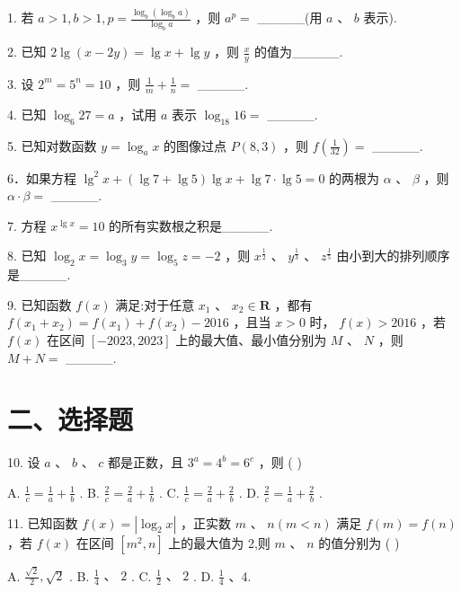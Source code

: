 1. 若 $a > 1,b > 1,p = \frac{{\log }_{b}\left( {{\log }_{b}a}\right) }{{\log }_{b}a}$ ，则 ${a}^{p} =$ \_\_\_\_\_(用 $a$ 、 $b$ 表示).

2. 已知 $2\lg \left( {x - {2y}}\right)  = \lg x + \lg y$ ，则 $\frac{x}{y}$ 的值为\_\_\_\_\_.

3. 设 ${2}^{m} = {5}^{n} = {10}$ ，则 $\frac{1}{m} + \frac{1}{n} =$ \_\_\_\_\_.

4. 已知 ${\log }_{6}{27} = a$ ，试用 $a$ 表示 ${\log }_{18}{16} =$ \_\_\_\_\_.

5. 已知对数函数 $y = {\log }_{a}x$ 的图像过点 $P\left( {8,3}\right)$ ，则 $f\left( \frac{1}{32}\right)  =$ \_\_\_\_\_.

6．如果方程 ${\lg }^{2}x + \left( {\lg 7 + \lg 5}\right) \lg x + \lg 7 \cdot  \lg 5 = 0$ 的两根为 $\alpha$ 、 $\beta$ ，则 $\alpha  \cdot  \beta  =$ \_\_\_\_\_.

7. 方程 ${x}^{\lg x} = {10}$ 的所有实数根之积是\_\_\_\_\_.

8. 已知 ${\log }_{2}x = {\log }_{3}y = {\log }_{5}z =  - 2$ ，则 ${x}^{\frac{1}{2}}$ 、 ${y}^{\frac{1}{3}}$ 、 ${z}^{\frac{1}{5}}$ 由小到大的排列顺序是\_\_\_\_\_.

9. 已知函数 $f\left( x\right)$ 满足:对于任意 ${x}_{1}$ 、 ${x}_{2} \in  \mathbf{R}$ ，都有 $f\left( {{x}_{1} + {x}_{2}}\right)  = f\left( {x}_{1}\right)  + f\left( {x}_{2}\right)  - {2016}$ ，且当 $x > 0$ 时， $f\left( x\right)  > {2016}$ ，若 $f\left( x\right)$ 在区间 $\left\lbrack  {-{2023},{2023}}\right\rbrack$ 上的最大值、最小值分别为 $M$ 、 $N$ ，则 $M + N =$ \_\_\_\_\_.

\section*{二、选择题}

10. 设 $a$ 、 $b$ 、 $c$ 都是正数，且 ${3}^{a} = {4}^{b} = {6}^{c}$ ，则 ( )

A. $\frac{1}{c} = \frac{1}{a} + \frac{1}{b}$ . B. $\frac{2}{c} = \frac{2}{a} + \frac{1}{b}$ . C. $\frac{1}{c} = \frac{2}{a} + \frac{2}{b}$ . D. $\frac{2}{c} = \frac{1}{a} + \frac{2}{b}$ .

11. 已知函数 $f\left( x\right)  = \left| {{\log }_{2}x}\right|$ ，正实数 $m$ 、 $n\left( {m < n}\right)$ 满足 $f\left( m\right)  = f\left( n\right)$ ，若 $f\left( x\right)$ 在区间 $\left\lbrack  {{m}^{2},n}\right\rbrack$ 上的最大值为 2,则 $m\text{ 、 }n$ 的值分别为 ( )

A. $\frac{\sqrt{2}}{2},\sqrt{2}$ . B. $\frac{1}{4}\text{ 、 }2$ . C. $\frac{1}{2}\text{ 、 }2$ . D. $\frac{1}{4}$ 、4.

